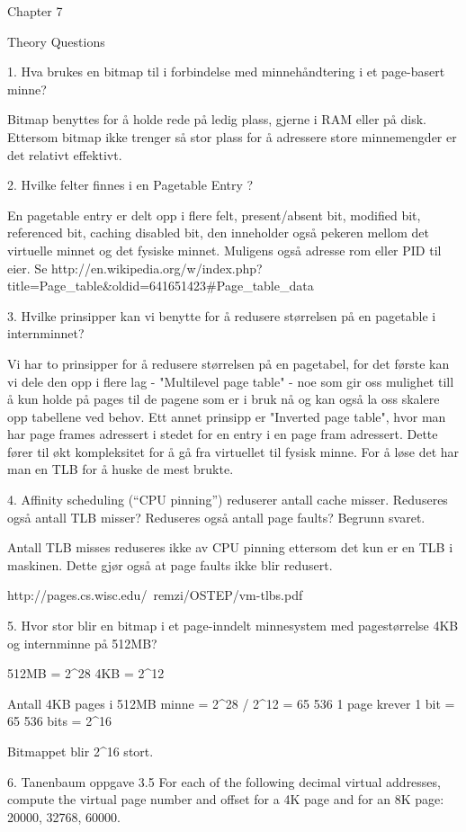 Chapter 7

Theory Questions

1. Hva brukes en bitmap til i forbindelse med minnehåndtering i et page-basert minne?

Bitmap benyttes for å holde rede på ledig plass, gjerne i RAM eller på disk. Ettersom bitmap ikke trenger så stor plass for å adressere store minnemengder er det relativt effektivt.

2. Hvilke felter finnes i en Pagetable Entry ?

En pagetable entry er delt opp i flere felt, present/absent bit, modified bit, referenced bit, caching disabled bit, den inneholder også pekeren mellom det virtuelle minnet og det fysiske minnet. Muligens også adresse rom eller PID til eier.
Se http://en.wikipedia.org/w/index.php?title=Page_table&oldid=641651423#Page_table_data

3.  Hvilke prinsipper kan vi benytte for å redusere størrelsen på en pagetable i internminnet?

Vi har to prinsipper for å redusere størrelsen på en pagetabel, for det første kan vi dele den opp i flere lag - "Multilevel page table" - noe som gir oss mulighet till å kun holde på pages til de pagene som er i bruk nå og kan også la oss skalere opp tabellene ved behov. Ett annet prinsipp er "Inverted page table", hvor man har page frames adressert i stedet for en entry i en page fram adressert. Dette fører til økt kompleksitet for å gå fra virtuellet til fysisk minne. For å løse det har man en TLB for å huske de mest brukte.

 4. Affinity scheduling (“CPU pinning”) reduserer antall cache misser. Reduseres også antall TLB misser? Reduseres også antall page faults? Begrunn svaret.

Antall TLB misses reduseres ikke av CPU pinning ettersom det kun er en TLB i maskinen. Dette gjør også at page faults ikke blir redusert.
 
http://pages.cs.wisc.edu/~remzi/OSTEP/vm-tlbs.pdf

5. Hvor stor blir en bitmap i et page-inndelt minnesystem med pagestørrelse 4KB og internminne på 512MB?

512MB = 2^28 
4KB   = 2^12 

Antall 4KB pages i 512MB minne = 2^28 / 2^12 = 65 536
1 page krever 1 bit = 65 536 bits = 2^16 

Bitmappet blir 2^16 stort.

6. Tanenbaum oppgave 3.5
For each of the following decimal virtual addresses, compute the virtual page number and offset for a 4K page and for an 8K page: 20000, 32768, 60000. 


